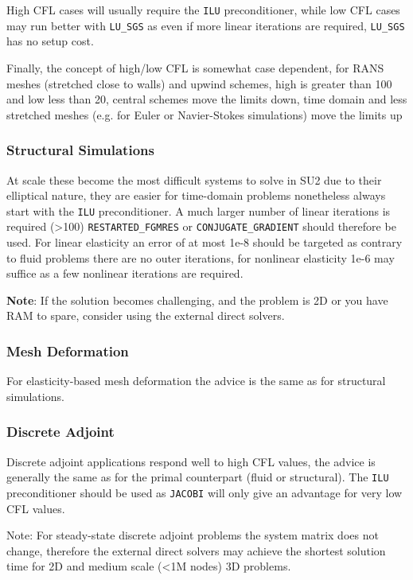 \documentclass{article}
\begin{document}
High CFL cases will usually require the \verb|ILU| preconditioner, while low CFL cases may run better with \verb|LU_SGS| as even if more linear iterations are required, \verb|LU_SGS| has no setup cost.

Finally, the concept of high/low CFL is somewhat case dependent, for RANS meshes (stretched close to walls) and upwind schemes, high is greater than 100 and low less than 20, central schemes move the limits down, time domain and less stretched meshes (e.g. for Euler or Navier-Stokes simulations) move the limits up

\subsubsection{Structural Simulations}
At scale these become the most difficult systems to solve in SU2 due to their elliptical nature, they are easier for time-domain problems nonetheless always start with the \verb|ILU| preconditioner. A much larger number of linear iterations is required (>100) \verb|RESTARTED_FGMRES| or \verb|CONJUGATE_GRADIENT| should therefore be used. For linear elasticity an error of at most 1e-8 should be targeted as contrary to fluid problems there are no outer iterations, for nonlinear elasticity 1e-6 may suffice as a few nonlinear iterations are required.

\textbf{Note}: If the solution becomes challenging, and the problem is 2D or you have RAM to spare, consider using the external direct solvers.

\subsubsection{Mesh Deformation}
For elasticity-based mesh deformation the advice is the same as for structural simulations.

\subsubsection{Discrete Adjoint}
Discrete adjoint applications respond well to high CFL values, the advice is generally the same as for the primal counterpart (fluid or structural). The \verb|ILU| preconditioner should be used as \verb|JACOBI| will only give an advantage for very low CFL values.

Note: For steady-state discrete adjoint problems the system matrix does not change, therefore the external direct solvers may achieve the shortest solution time for 2D and medium scale (<1M nodes) 3D problems.
\end{document}
